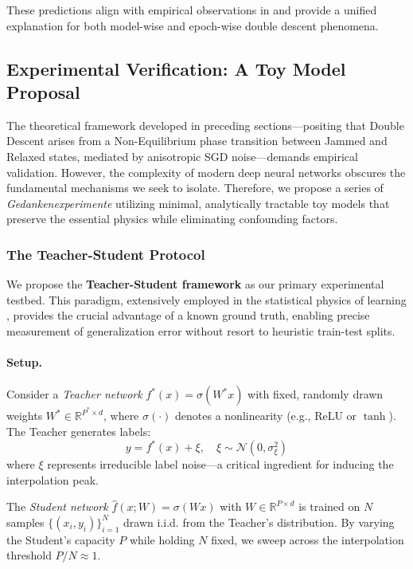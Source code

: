 These predictions align with empirical observations in \cite{nakkiran_deep_2019} and provide a unified explanation for both model-wise and epoch-wise double descent phenomena.

\subsection{Experimental Verification: A Toy Model Proposal}

The theoretical framework developed in preceding sections---positing that Double Descent arises from a Non-Equilibrium phase transition between Jammed and Relaxed states, mediated by anisotropic SGD noise---demands empirical validation. However, the complexity of modern deep neural networks obscures the fundamental mechanisms we seek to isolate. Therefore, we propose a series of \textit{Gedankenexperimente} utilizing minimal, analytically tractable toy models that preserve the essential physics while eliminating confounding factors.

\subsubsection{The Teacher-Student Protocol}

We propose the \textbf{Teacher-Student framework} as our primary experimental testbed. This paradigm, extensively employed in the statistical physics of learning \cite{engel2001statistical,advani2013statistical}, provides the crucial advantage of a known ground truth, enabling precise measurement of generalization error without resort to heuristic train-test splits.

\paragraph{Setup.} Consider a \textit{Teacher network} $f^*(x) = \sigma(W^* x)$ with fixed, randomly drawn weights $W^* \in \mathbb{R}^{P^* \times d}$, where $\sigma(\cdot)$ denotes a nonlinearity (e.g., ReLU or $\tanh$). The Teacher generates labels:
\begin{equation}
    y = f^*(x) + \xi, \quad \xi \sim \mathcal{N}(0, \sigma_\xi^2)
\end{equation}
where $\xi$ represents irreducible label noise---a critical ingredient for inducing the interpolation peak.

The \textit{Student network} $\hat{f}(x; W) = \sigma(W x)$ with $W \in \mathbb{R}^{P \times d}$ is trained on $N$ samples $\{(x_i, y_i)\}_{i=1}^N$ drawn i.i.d. from the Teacher's distribution. By varying the Student's capacity $P$ while holding $N$ fixed, we sweep across the interpolation threshold $P/N \approx 1$.

